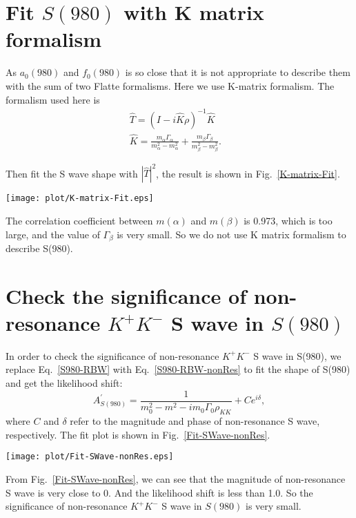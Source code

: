 \section{Fit $S(980)$ with K matrix formalism}
\label{app:a0_f0_K_matrix}
{
    As $a_{0}(980)$ and $f_{0}(980)$ is so close that it is not appropriate to describe them with the sum of two Flatte formalisms.
    Here we use K-matrix formalism. 
    The formalism used here is
    \begin{equation}
        \begin{array}{lr}
            \hat{T} = (I - i\hat{K}\rho)^{-1} \hat{K}&\\
            \hat{K} = \frac{m_{\alpha}\Gamma_{\alpha}}{m_{\alpha}^{2} - m_{\alpha}^{2}} + \frac{m_{\beta}\Gamma_{\beta}}{m_{\beta}^{2} - m_{\beta}^{2}}. &
        \end{array}\label{K-matrix} 
    \end{equation}

    Then fit the S wave shape with $|\hat{T}|^{2}$, the result is shown in Fig.~\ref{K-matrix-Fit}.

    \begin{figure*}[htbp]
        \centering
        \texttt{[image: plot/K-matrix-Fit.eps]}
        \caption{Fit $S(980)$ with $|\hat{T}|^{2}$.}
        \label{K-matrix-Fit}
    \end{figure*}
    The correlation coefficient between $m(\alpha)$ and $m(\beta)$ is 0.973, which is too large, and the value of $\Gamma_{\beta}$ is very small.
    So we do not use K matrix formalism to describe S(980).
    
}

\section{Check the significance of non-resonance $K^{+}K^{-}$ S wave in $S(980)$}
\label{app:a0_f0_nonRes}
{
    In order to check the significance of non-resonance $K^{+}K^{-}$ S wave in S(980), we replace Eq.~\ref{S980-RBW} with Eq.~\ref{S980-RBW-nonRes} to fit the shape of S(980) and get the likelihood shift: 
    \begin{equation}
        A_{S(980)}^{'} = \frac{1}{m_{0}^{2} - m^{2} -im_{0}\Gamma_{0}\rho_{KK}} + Ce^{i\delta}, \label{S980-RBW-nonRes}
    \end{equation}
    where $C$ and $\delta$ refer to the magnitude and phase of non-resonance S wave, respectively.
    The fit plot is shown in Fig.~\ref{Fit-SWave-nonRes}.
    \begin{figure*}[htbp]
        \centering
        \texttt{[image: plot/Fit-SWave-nonRes.eps]}
        \caption{Fit $S(980)$ with $|A_{S(980)}^{'}|^{2}$.}
        \label{Fit-SWave-nonRes}
    \end{figure*}
    From Fig.~\ref{Fit-SWave-nonRes}, we can see that the magnitude of non-resonance S wave is very close to 0.
    And the likelihood shift is less than 1.0.
    So the significance of non-resonance $K^{+}K^{-}$ S wave in $S(980)$ is very small.
}
